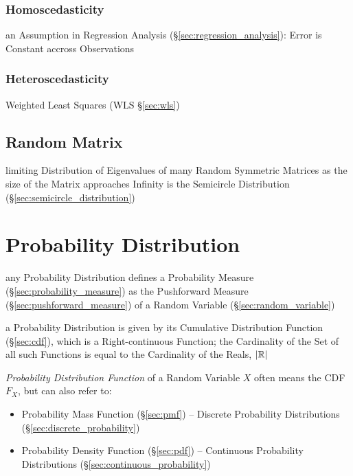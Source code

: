 \subsubsection{Homoscedasticity}\label{sec:homoscedasticity}

an Assumption in Regression Analysis (\S\ref{sec:regression_analysis}): Error is
Constant accross Observations



\subsubsection{Heteroscedasticity}\label{sec:heteroscedasticity}

Weighted Least Squares (WLS \S\ref{sec:wls})



\subsection{Random Matrix}\label{sec:random_matrix}

limiting Distribution of Eigenvalues of many Random Symmetric Matrices
as the size of the Matrix approaches Infinity is the Semicircle Distribution
(\S\ref{sec:semicircle_distribution})



\section{Probability Distribution}\label{sec:probability_distribution}

any Probability Distribution defines a Probability Measure
(\S\ref{sec:probability_measure}) as the Pushforward Measure
(\S\ref{sec:pushforward_measure}) of a Random Variable
(\S\ref{sec:random_variable})

a Probability Distribution is given by its Cumulative Distribution Function
(\S\ref{sec:cdf}), which is a Right-continuous Function; the Cardinality of the
Set of all such Functions is equal to the Cardinality of the Reals, $|\mathbb{R}|$

\emph{Probability Distribution Function} of a Random Variable $X$ often means
the CDF $F_X$, but can also refer
to:
\begin{itemize}
  \item Probability Mass Function (\S\ref{sec:pmf}) -- Discrete Probability
    Distributions (\S\ref{sec:discrete_probability})
  \item Probability Density Function (\S\ref{sec:pdf}) -- Continuous Probability
    Distributions (\S\ref{sec:continuous_probability})
\end{itemize}

